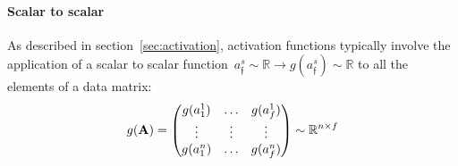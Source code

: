 \documentclass{article}
\begin{document}
\begin{appendices}
\paragraph{Scalar to scalar}  As described in section~\ref{sec:activation}, activation functions typically involve the application of a scalar to scalar function~$a^s_\mathfrak{f} \sim \mathbb{R} \rightarrow g(a^s_\mathfrak{f}) \sim \mathbb{R}$ to all the elements of a data matrix: 
\begin{equation*}
g({\bf A}) = 
\left(
\begin{matrix}
    g(a^1_1) & \dots & g(a^1_f) \\
    \vdots & \vdots & \vdots \\
    g(a^n_1) & \dots & g(a^n_f)
\end{matrix}
\right) \sim \mathbb{R}^{n \times f} 
\end{equation*}

\newcommand\tempboxAppendixActivation{%
\begin{minipage}{0.2\textwidth}%
\abovedisplayskip=0pt
\belowdisplayskip=0pt
\begin{align*}
\text{d} g \left( {\bf A} \right) &= \left(
\begin{matrix}
    \text{d} g(a^1_1) & \dots & \text{d} g(a^1_f) \\
    \vdots & \vdots & \vdots \\
	\text{d} g(a^n_1) & \dots & \text{d} g(a^n_f)
\end{matrix} \right) \\
&= \left(
\begin{matrix}
    g^\prime(a^1_1) \text{d} a^1_1 & \dots & g^\prime(a^1_f) \text{d} a^1_f \\
    \vdots & \vdots & \vdots \\
    g^\prime(a^n_1) \text{d} a^n_1 & \dots & g^\prime(a^n_f) \text{d} a^n_f
\end{matrix} 
\right) \\
&=
\left(
\begin{matrix}
    g^\prime(a^1_1) & \dots & g^\prime(a^1_f)  \\
    \vdots & \vdots & \vdots \\
    g^\prime(a^n_1) & \dots & g^\prime(a^n_f)
\end{matrix}
\right) \circ
\left(
\begin{matrix}
    \text{d} a^1_1 & \dots & \text{d} a^1_f  \\
    \vdots & \vdots & \vdots \\
    \text{d} a^n_1 & \dots & \text{d} a^n_f
\end{matrix}
\right) \\
&= g^\prime({\bf A}) \circ \text{d} {\bf A}
\end{align*}
\end{minipage}}


\end{appendices}
\end{document}
